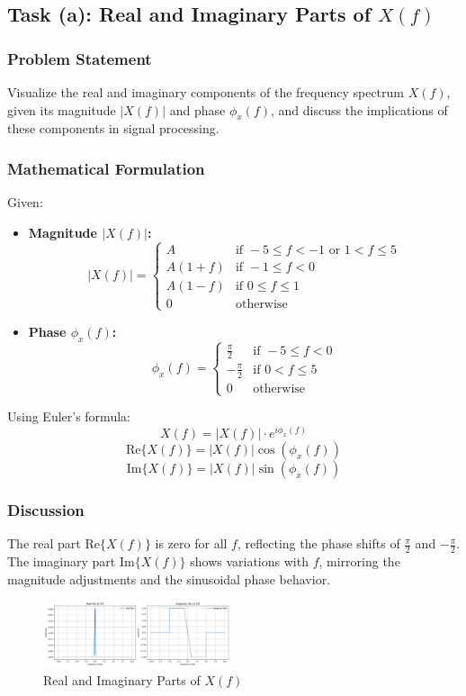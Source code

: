 
\item[(a)]
\subsection{Task (a): Real and Imaginary Parts of $X(f)$}

\subsubsection{Problem Statement}
Visualize the real and imaginary components of the frequency spectrum $X(f)$, given its magnitude $|X(f)|$ and phase $\phi_x(f)$, and discuss the implications of these components in signal processing.

\subsubsection{Mathematical Formulation}
Given:
\begin{itemize}
    \item \textbf{Magnitude $|X(f)|$:}
    \[
    |X(f)| =
    \begin{cases}
    A & \text{if } -5 \leq f < -1 \text{ or } 1 < f \leq 5 \\
    A(1 + f) & \text{if } -1 \leq f < 0 \\
    A(1 - f) & \text{if } 0 \leq f \leq 1 \\
    0 & \text{otherwise}
    \end{cases}
    \]

    \item \textbf{Phase $\phi_x(f)$:}
    \[
    \phi_x(f) =
    \begin{cases}
    \frac{\pi}{2} & \text{if } -5 \leq f < 0 \\
    -\frac{\pi}{2} & \text{if } 0 < f \leq 5 \\
    0 & \text{otherwise}
    \end{cases}
    \]
\end{itemize}

Using Euler's formula:
\[
X(f) = |X(f)| \cdot e^{i \phi_x(f)}
\]
\[
\text{Re}\{X(f)\} = |X(f)| \cos(\phi_x(f))
\]
\[
\text{Im}\{X(f)\} = |X(f)| \sin(\phi_x(f))
\]

\subsubsection{Discussion}
The real part $\text{Re}\{X(f)\}$ is zero for all $f$, reflecting the phase shifts of $\frac{\pi}{2}$ and $-\frac{\pi}{2}$. The imaginary part $\text{Im}\{X(f)\}$ shows variations with $f$, mirroring the magnitude adjustments and the sinusoidal phase behavior.

\begin{figure}[h]
    \centering
    \includegraphics[width=0.49\textwidth]{fig/ex2_a_plot}
    \caption{Real and Imaginary Parts of $X(f)$}
    \label{fig:ex2_a_plot}
\end{figure}

